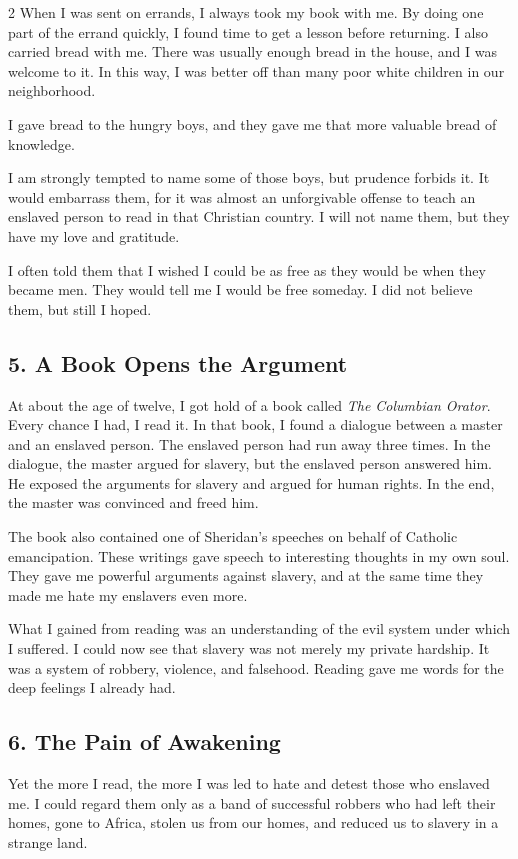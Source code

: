 \documentclass[12pt]{article}
\begin{document}
\begin{multicols}{2}
When I was sent on errands, I always took my book with me. By doing one part of the errand quickly, I found time to get a lesson before returning. I also carried bread with me. There was usually enough bread in the house, and I was welcome to it. In this way, I was better off than many poor white children in our neighborhood.

I gave bread to the hungry boys, and they gave me that more valuable bread of knowledge.

I am strongly tempted to name some of those boys, but prudence forbids it. It would embarrass them, for it was almost an unforgivable offense to teach an enslaved person to read in that Christian country. I will not name them, but they have my love and gratitude.

I often told them that I wished I could be as free as they would be when they became men. They would tell me I would be free someday. I did not believe them, but still I hoped.

\subsection*{5. A Book Opens the Argument}
At about the age of twelve, I got hold of a book called \textit{The Columbian Orator}. Every chance I had, I read it. In that book, I found a dialogue between a master and an enslaved person. The enslaved person had run away three times. In the dialogue, the master argued for slavery, but the enslaved person answered him. He exposed the arguments for slavery and argued for human rights. In the end, the master was convinced and freed him.

The book also contained one of Sheridan's speeches on behalf of Catholic emancipation. These writings gave speech to interesting thoughts in my own soul. They gave me powerful arguments against slavery, and at the same time they made me hate my enslavers even more.

What I gained from reading was an understanding of the evil system under which I suffered. I could now see that slavery was not merely my private hardship. It was a system of robbery, violence, and falsehood. Reading gave me words for the deep feelings I already had.

\subsection*{6. The Pain of Awakening}
Yet the more I read, the more I was led to hate and detest those who enslaved me. I could regard them only as a band of successful robbers who had left their homes, gone to Africa, stolen us from our homes, and reduced us to slavery in a strange land.


\end{multicols}
\end{document}
